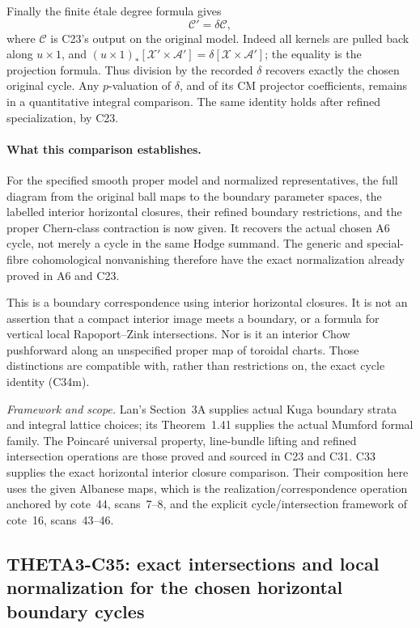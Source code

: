 \documentclass[11pt]{article}
\newcommand{\framework}[1]{\par\smallskip\noindent\textit{Framework and scope.} #1\par}
\theoremstyle{definition}\newtheorem{definition}[theorem]{Definition}\newtheorem{remark}[theorem]{Remark}
\begin{document}
Finally the finite \'etale degree
formula gives
\[
                          \mathcal C'=\delta\mathcal C,
                                                        \tag{C34m}
\]
where $\mathcal C$ is C23's output
on the original model. Indeed all
kernels are pulled back along
$u\times1$, and
$(u\times1)_*[\mathcal X'\times\mathcal A']
=\delta[\mathcal X\times\mathcal A']$;
the equality is the projection
formula. Thus division by the
recorded $\delta$ recovers exactly
the chosen original cycle. Any
$p$-valuation of $\delta$, and of
its CM projector coefficients,
remains in a quantitative integral
comparison. The same identity holds
after refined specialization, by
C23.

\paragraph{What this comparison establishes.}
For the specified smooth proper
model and normalized representatives,
the full diagram from the original
ball maps to the boundary parameter
spaces, the labelled interior
horizontal closures, their refined
boundary restrictions, and the
proper Chern-class contraction is
now given. It recovers the actual
chosen A6 cycle, not merely a cycle
in the same Hodge summand. The
generic and special-fibre
cohomological nonvanishing therefore
have the exact normalization already
proved in A6 and C23.

This is a boundary correspondence
using interior horizontal closures.
It is not an assertion that a
compact interior image meets a
boundary, or a formula for vertical
local Rapoport--Zink intersections.
Nor is it an interior Chow
pushforward along an unspecified
proper map of toroidal charts.
Those distinctions are compatible
with, rather than restrictions on,
the exact cycle identity (C34m).

\framework{Lan's Section~3A supplies
actual Kuga boundary strata and
integral lattice choices; its
Theorem~1.41 supplies the actual
Mumford formal family. The
Poincar\'e universal property,
line-bundle lifting and refined
intersection operations are those
proved and sourced in C23 and C31.
C33 supplies the exact horizontal
interior closure comparison. Their
composition here uses the given
Albanese maps, which is the
realization/correspondence operation
anchored by cote~44, scans~7--8,
and the explicit cycle/intersection
framework of cote~16,
scans~43--46.}


\subsection{THETA3-C35: exact intersections and local normalization for the chosen horizontal boundary cycles}\label{C35}
\end{document}
